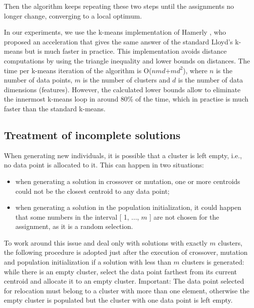 Then the algorithm keeps repeating these two steps until the assignments no longer change, converging to a local optimum.

In our experiments, we use the k-means implementation of Hamerly \cite{Hamerly2010}, who proposed an acceleration that gives the same answer of the standard Lloyd's k-means \cite{Lloyd1982} but is much faster in practice. This implementation avoids distance computations by using the triangle inequality and lower bounds on distances. The time per k-means iteration of the algorithm is O($nmd$+$md^2$), where $n$ is the number of data points, $m$ is the number of clusters and $d$ is the number of data dimensions (features). However, the calculated lower bounds allow to eliminate the innermost k-means loop in around 80\% of the time, which in practise is much faster than the standard k-means.

\subsection{Treatment of incomplete solutions}
When generating new individuals, it is possible that a cluster is left empty, i.e., no data point is allocated to it. This can happen in two situations: 

\begin{itemize}
	
	\item when generating a solution in crossover or mutation, one or more centroids could not be the closest centroid to any data point;

	\item when generating a solution in the population initialization, it could happen that some numbers in the interval [ 1, ..., $m$ ] are not chosen for the assignment, as it is a random selection.
	
\end{itemize}

To work around this issue and deal only with solutions with exactly $m$ clusters, the following procedure is adopted just after the execution of crossover, mutation and population initialization if a solution with less than $m$ clusters is generated: while there is an empty cluster, select the data point farthest from its current centroid and allocate it to an empty cluster. Important: The data point selected for relocation must belong to a cluster with more than one element, otherwise the empty cluster is populated but the cluster with one data point is left empty.

